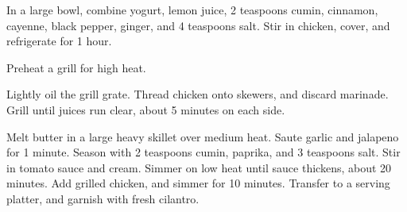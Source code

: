 
\info[servings=4,
		time = 140, 
		energy = 404,
		energyunit = kcal,
		urlsource = http://allrecipes.com/recipe/45736/chicken-tikka-masala/]{}

\begin{ingredientsc}
	\begin{column}[Teaspoon]
	\end{column}
	\begin{column}[Tablespoon]
	\end{column}
	\begin{column}
	\end{column}
\end{ingredientsc}

\begin{preparation}
	\step In a large bowl, combine yogurt, lemon juice, 2 teaspoons cumin, cinnamon, cayenne, black pepper, ginger, and 4 teaspoons salt. Stir in chicken, cover, and refrigerate for 1 hour.
	
	\step Preheat a grill for high heat.
	
	\step Lightly oil the grill grate. Thread chicken onto skewers, and discard marinade. Grill until juices run clear, about 5 minutes on each side.
	
	\step Melt butter in a large heavy skillet over medium heat. Saute garlic and jalapeno for 1 minute. Season with 2 teaspoons cumin, paprika, and 3 teaspoons salt. Stir in tomato sauce and cream. Simmer on low heat until sauce thickens, about 20 minutes. Add grilled chicken, and simmer for 10 minutes. Transfer to a serving platter, and garnish with fresh cilantro.
\end{preparation}

\begin{notes}
\end{notes}

